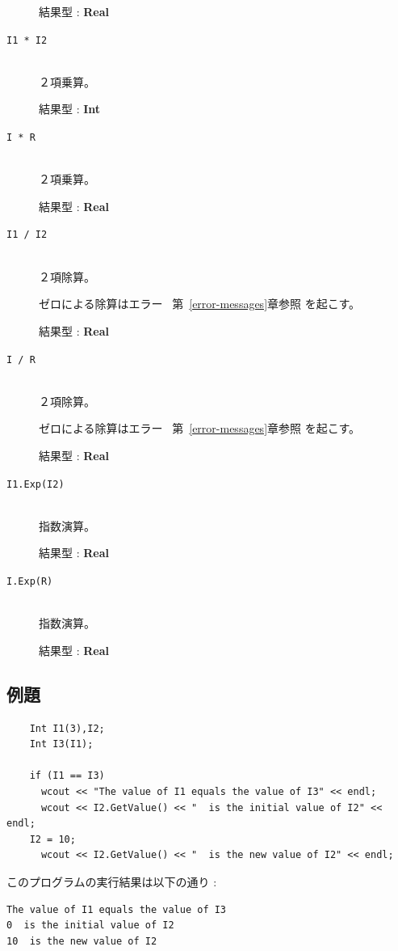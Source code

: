 \documentclass[\pformat,12pt]{jarticle}
\begin{document}
\begin{description}
     結果型 : {\bf Real}

\item[{\tt I1 * I2}] \mbox{}\\
     ２項乗算。 

     結果型 : {\bf Int}

\item[{\tt I * R}] \mbox{}\\
     ２項乗算。 

     結果型 : {\bf Real}

\item[{\tt I1 / I2}] \mbox{}\\
     ２項除算。 

     ゼロによる除算はエラー \ 第~\ref{error-messages}章参照 を起こす。

     結果型 : {\bf Real}

\item[{\tt I / R}] \mbox{}\\
     ２項除算。 

     ゼロによる除算はエラー \ 第~\ref{error-messages}章参照 を起こす。

     結果型 : {\bf Real}

\item[{\tt I1.Exp(I2)}] \mbox{}\\
     指数演算。

     結果型 : {\bf Real}

\item[{\tt I.Exp(R)}] \mbox{}\\
     指数演算。

     結果型 : {\bf Real}

\end{description}

\subsection*{例題}

\begin{verbatim}
    Int I1(3),I2;
    Int I3(I1);

    if (I1 == I3)
      wcout << "The value of I1 equals the value of I3" << endl;
      wcout << I2.GetValue() << "  is the initial value of I2" << endl;
    I2 = 10;
      wcout << I2.GetValue() << "  is the new value of I2" << endl;
\end{verbatim}

\noindent このプログラムの実行結果は以下の通り :

\begin{verbatim}
The value of I1 equals the value of I3
0  is the initial value of I2
10  is the new value of I2
\end{verbatim}
\end{document}
